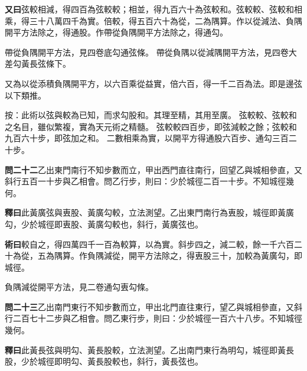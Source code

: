 \documentclass[12pt,a4paper]{article}
\begin{document}
\vspace{0.3em}

\noindent\textbf{又曰}\quad 弦較相減，得四百為弦較較；相並，得九百六十為弦較和。弦較較、弦較和相乘，得三十八萬四千為實。倍較，得五百六十為從，二為隅算。作以從減法、負隅開平方法除之，得通股。作帶從負隅開平方法除之，得通勾。

\vspace{0.3em}

帶從負隅開平方法，見四卷底勾通弦條。
帶從負隅以從減隅開平方法，見四卷大差勾黃長弦條下。

又為以從添積負隅開平方，以六百乘從益實，倍六百，得一千二百為法。即是邊弦以下類推。

\vspace{0.5em}

\noindent
按：此術以弦與較為已知，而求勾股和。其理至精，其用至廣。
弦較較、弦較和之名目，雖似繁複，實為天元術之精髓。
弦較較四百步，即弦減較之餘；弦較和九百六十步，即弦加之和。
二數相乘為實，以開平方得通股六百步、通勾三百二十步。

\vspace{0.5em}

\noindent\textbf{問二十二}\quad 乙出東門南行不知步數而立，甲出西門直往南行，回望乙與城相參直，又斜行五百一十步與乙相會。問乙行步，則曰：少於城徑二百一十步。不知城徑幾何。

\vspace{0.3em}

\noindent\textbf{釋曰}\quad 此黃廣弦與叀股、黃廣勾較，立法測望。乙出東門南行為叀股，城徑即黃廣勾，少於城徑即叀股、黃廣勾較也，斜行，黃廣弦也。

\vspace{0.3em}

\noindent\textbf{術曰}\quad 較自之，得四萬四千一百為較算，以為實。斜步四之，減二較，餘一千六百二十為從，五為隅算。作負隅減從，開平方法除之，得叀股三十，加較為黃廣勾，即城徑。

\vspace{0.3em}

負隅減從開平方法，見二卷通勾叀勾條。

\vspace{0.5em}

\noindent\textbf{問二十三}\quad 乙出南門東行不知步數而立，甲出北門直往東行，望乙與城相參直，又斜行二百七十二步與乙相會。問乙東行步，則曰：少於城徑一百六十八步。不知城徑幾何。

\vspace{0.3em}

\noindent\textbf{釋曰}\quad 此黃長弦與明勾、黃長股較，立法測望。乙出南門東行為明勾，城徑即黃長股，少於城徑即明勾、黃長股較也，斜行，黃長弦也。
\end{document}
